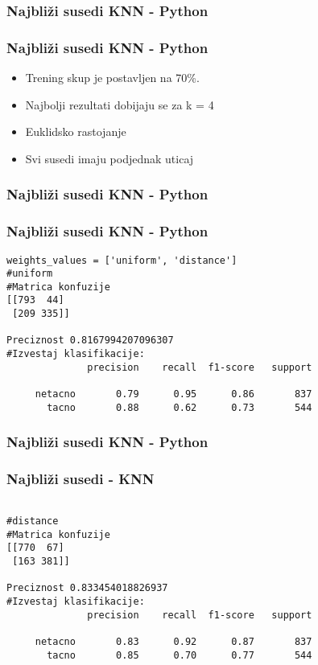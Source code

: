\documentclass{beamer}
\begin{document}
\subsubsection*{Najbliži susedi KNN - Python}
\begin{frame}[fragile]
\frametitle{Najbliži susedi KNN - Python}
\begin{itemize}
\item Trening skup je postavljen na 70\%. 
\item Najbolji rezultati dobijaju se za k = 4
\item Euklidsko rastojanje 
\item Svi susedi imaju podjednak uticaj
\end{itemize}
\end{frame}

\subsubsection*{Najbliži susedi KNN - Python}
\begin{frame}[fragile]
\frametitle{Najbliži susedi KNN - Python}

\begin{lstlisting}
weights_values = ['uniform', 'distance']
#uniform
#Matrica konfuzije
[[793  44]
 [209 335]]

Preciznost 0.8167994207096307
#Izvestaj klasifikacije:
              precision    recall  f1-score   support

     netacno       0.79      0.95      0.86       837
       tacno       0.88      0.62      0.73       544

\end{lstlisting} 

\end{frame}

\subsubsection*{Najbliži susedi KNN - Python}
\begin{frame}[fragile]
\frametitle{Najbliži susedi - KNN}

\begin{lstlisting}

#distance
#Matrica konfuzije
[[770  67]
 [163 381]]

Preciznost 0.833454018826937
#Izvestaj klasifikacije:
              precision    recall  f1-score   support

     netacno       0.83      0.92      0.87       837
       tacno       0.85      0.70      0.77       544

\end{lstlisting} 

\end{frame}
\end{document}
